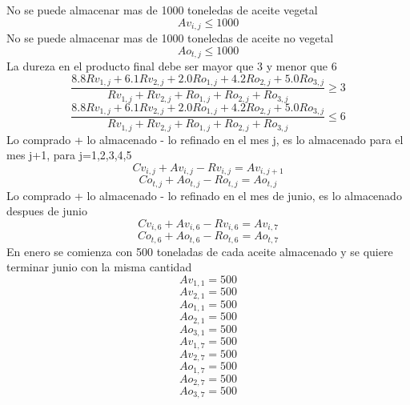 No se puede almacenar mas de 1000 toneledas de aceite vegetal
\begin{equation}
Av_{i,j} \leq 1000
\end{equation}
No se puede almacenar mas de 1000 toneledas de aceite no vegetal
\begin{equation}
Ao_{t,j} \leq 1000
\end{equation}
La dureza en el producto final debe ser mayor que 3 y menor que 6
\begin{equation}
 \frac{ 8.8 Rv_{1,j} + 6.1 Rv_{2,j} + 2.0 Ro_{1,j} + 4.2 Ro_{2,j} + 5.0 Ro_{3,j} } { Rv_{1,j} + Rv_{2,j} + Ro_{1,j} + Ro_{2,j} + Ro_{3,j}} \geq 3
\end{equation}
\begin{equation}
 \frac{8.8 Rv_{1,j} + 6.1 Rv_{2,j} + 2.0 Ro_{1,j} + 4.2 Ro_{2,j} + 5.0 Ro_{3,j}}{Rv_{1,j} + Rv_{2,j} + Ro_{1,j} + Ro_{2,j} + Ro_{3,j}} \leq 6
\end{equation}
Lo comprado + lo almacenado - lo refinado en el mes j, es lo almacenado para el mes j+1, para j=1,2,3,4,5
\begin{equation}
Cv_{i,j} + Av_{i,j} - Rv_{i,j} = Av_{i,j+1}
\end{equation}
\begin{equation}
Co_{t,j} + Ao_{t,j} - Ro_{t,j} = Ao_{t,j} 
\end{equation}
Lo comprado + lo almacenado - lo refinado en el mes de junio, es lo almacenado despues de junio
\begin{equation}
Cv_{i,6} + Av_{i,6} - Rv_{i,6} = Av_{i,7}
\end{equation}
\begin{equation}
Co_{t,6} + Ao_{t,6} - Ro_{t,6} = Ao_{t,7} 
\end{equation}
En enero se comienza con 500 toneladas de cada aceite almacenado y se quiere terminar junio con la misma cantidad
\begin{equation}
Av_{1,1}=500
\end{equation}
\begin{equation}
Av_{2,1}=500
\end{equation}
\begin{equation}
Ao_{1,1}=500
\end{equation}
\begin{equation}
Ao_{2,1}=500
\end{equation}
\begin{equation}
Ao_{3,1}=500
\end{equation}
\begin{equation}
Av_{1,7}=500
\end{equation}
\begin{equation}
Av_{2,7}=500
\end{equation}
\begin{equation}
Ao_{1,7}=500
\end{equation}
\begin{equation}
Ao_{2,7}=500
\end{equation}
\begin{equation}
Ao_{3,7}=500
\end{equation}


